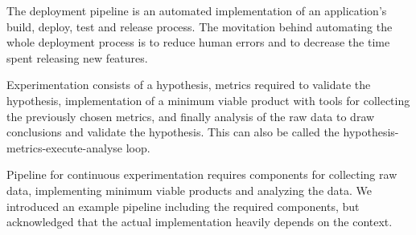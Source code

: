 \documentclass[conference]{IEEEtran}
\begin{document}
The deployment pipeline is an automated implementation of an application's build, deploy, test and release process. The movitation behind automating the whole deployment process is to reduce human errors and to decrease the time spent releasing new features.

Experimentation consists of a hypothesis, metrics required to validate the hypothesis, implementation of a minimum viable product with tools for collecting the previously chosen metrics, and finally analysis of the raw data to draw conclusions and validate the hypothesis. This can also be called the hypothesis-metrics-execute-analyse loop.

Pipeline for continuous experimentation requires components for collecting raw data, implementing minimum viable products and analyzing the data. We introduced an example pipeline including the required components, but acknowledged that the actual implementation heavily depends on the context.


{}




%
%






\end{document}
